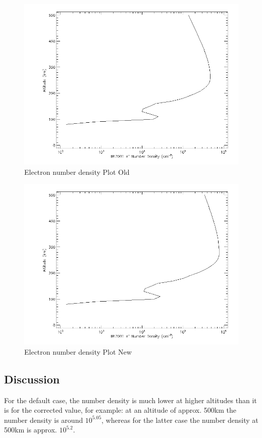 \begin{figure}[h]
	\centering
	\includegraphics[width=\linewidth]{images/E_number_density_plot1}	
	\caption{Electron number density Plot Old}
	\label{fig:ass2Plot1}
\end{figure}
\begin{figure}[h]
	\centering
	\includegraphics[width=\linewidth]{images/E_number_density_plot2}	
	\caption{Electron number density Plot New}
	\label{fig:ass2Plot2}
\end{figure}

\subsection{Discussion}
For the default case, the number density is much lower at higher altitudes than it is for the corrected value, for example: at an altitude of approx. 500km the number density is around $10^{5.05}$, whereas for the latter case the number density at 500km is approx. $10^{5.2}$.





